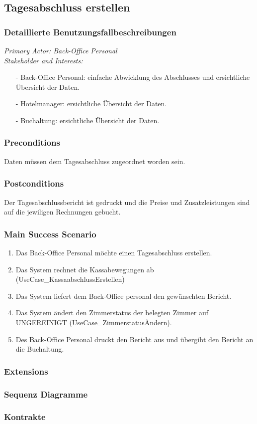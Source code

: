 \documentclass[./detailed_overview_usecases.tex]{subfiles}
\begin{document}
    \subsection{Tagesabschluss erstellen}
    \subsubsection{Detaillierte Benutzungsfallbeschreibungen}
    \textit{Primary Actor: Back-Office Personal}
    \\
    \textit{Stakeholder and Interests:}
    \begin{itemize}
        \item[-] Back-Office Personal: einfache Abwicklung des Abschlusses und ersichtliche Übersicht der Daten.
        \item[-] Hotelmanager: ersichtliche Übersicht der Daten.
        \item[-] Buchaltung: ersichtliche Übersicht der Daten.
    \end{itemize}

    \subsubsection*{Preconditions}
    Daten müssen dem Tagesabschluss zugeordnet worden sein.
    \subsubsection*{Postconditions}
    Der Tagesabschlussbericht ist gedruckt und die Preise und Zusatzleistungen sind auf die jewiligen Rechnungen gebucht.

    \subsubsection*{Main Success Scenario}
    \begin{enumerate}
        \item Das Back-Office Personal möchte einen Tagesabschluss erstellen.
        \item Das System rechnet die Kassabewegungen ab (UseCase_KassaabschlussErstellen)
        \item Das System liefert dem Back-Office personal den gewünschten Bericht.
        \item Das System ändert den Zimmerstatus der belegten Zimmer auf UNGEREINIGT (UseCase_ZimmerstatusÄndern).
        \item Des Back-Office Personal druckt den Bericht aus und übergibt den Bericht an die Buchaltung.
    \end{enumerate}

    \subsubsection*{Extensions}

    \subsubsection{Sequenz Diagramme}
    \subsubsection{Kontrakte}
\end{document}
